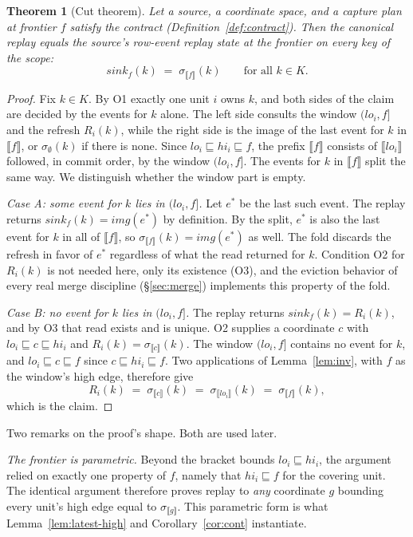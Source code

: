 \documentclass[sigconf,nonacm,10pt]{acmart}
\theoremstyle{plain}
\newtheorem{theorem}{Theorem}
\theoremstyle{definition}
\newcommand{\den}[1]{\llbracket #1 \rrbracket}   %
\newcommand{\pre}{\sqsubseteq}                   %
\newcommand{\window}[2]{(#1,#2]}                 %
\newcommand{\imgof}{\mathit{img}}                %
\newcommand{\sink}{\mathit{sink}}                %
\newcommand{\keys}{K}                            %
\begin{document}
\begin{theorem}[Cut theorem]\label{thm:cut}
Let a source, a coordinate space, and a capture plan at frontier $f$
satisfy the contract (Definition~\ref{def:contract}). Then the
canonical replay equals the source's row-event replay state at the
frontier on every key of the scope:
\[
\sink_f(k) \;=\; \sigma_{\den{f}}(k)
\qquad\text{for all } k \in \keys.
\]
\end{theorem}

\begin{proof}
Fix $k \in \keys$. By O1 exactly one unit $i$ owns $k$, and both
sides of the claim are decided by the events for $k$ alone. The left
side consults the window $\window{lo_i}{f}$ and the refresh
$R_i(k)$, while the right side is the image of the last event for
$k$ in $\den{f}$, or $\sigma_\emptyset(k)$ if there is none. Since
$lo_i \pre hi_i \pre f$, the prefix $\den{f}$ consists of
$\den{lo_i}$ followed, in commit order, by the window
$\window{lo_i}{f}$. The events for $k$ in $\den{f}$ split the same
way. We distinguish whether the window part is empty.

\emph{Case A: some event for $k$ lies in $\window{lo_i}{f}$.} Let
$e^{\ast}$ be the last such event. The replay returns
$\sink_f(k) = \imgof(e^{\ast})$ by definition. By the split,
$e^{\ast}$ is also the last event for $k$ in all of $\den{f}$, so
$\sigma_{\den{f}}(k) = \imgof(e^{\ast})$ as well. The fold discards
the refresh in favor of $e^{\ast}$ regardless of what the read
returned for $k$. Condition O2 for 
$R_i(k)$ is not needed here, only its existence (O3), and the
eviction behavior of every real merge discipline
(\S\ref{sec:merge}) implements this property of the fold.

\emph{Case B: no event for $k$ lies in $\window{lo_i}{f}$.} The
replay returns $\sink_f(k) = R_i(k)$, and by O3 that read exists
and is unique. O2 supplies a coordinate $c$ with
$lo_i \pre c \pre hi_i$ and $R_i(k) = \sigma_{\den{c}}(k)$. The window $\window{lo_i}{f}$ contains no event for $k$, and $lo_i \pre c \pre f$ since $c \pre hi_i \pre f$. Two applications
of Lemma~\ref{lem:inv}, with $f$ as the window's high edge,
therefore give
\[
R_i(k) \;=\; \sigma_{\den{c}}(k)
       \;=\; \sigma_{\den{lo_i}}(k)
       \;=\; \sigma_{\den{f}}(k),
\]
which is the claim.
\end{proof}

Two remarks on the proof's shape. Both are used later.

\emph{The frontier is parametric.} Beyond the bracket bounds
$lo_i \pre hi_i$, the argument relied on exactly one property of $f$,
namely that $hi_i \pre f$ for the covering unit. The identical argument
therefore proves replay to \emph{any} coordinate $g$ bounding every
unit's high edge equal to $\sigma_{\den{g}}$. This parametric form
is what Lemma~\ref{lem:latest-high} and
Corollary~\ref{cor:cont} instantiate.
\end{document}
